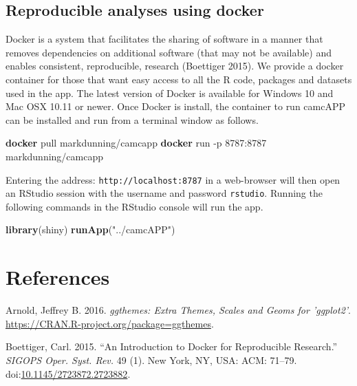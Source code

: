 \documentclass[]{article}
\newenvironment{Shaded}{\begin{snugshade}}{\end{snugshade}}
\newcommand{\KeywordTok}[1]{\textcolor[rgb]{0.13,0.29,0.53}{\textbf{{#1}}}}
\newcommand{\StringTok}[1]{\textcolor[rgb]{0.31,0.60,0.02}{{#1}}}
\newcommand{\NormalTok}[1]{{#1}}
\begin{document}
\subsection{Reproducible analyses using
docker}\label{reproducible-analyses-using-docker}

Docker is a system that facilitates the sharing of software in a manner
that removes dependencies on additional software (that may not be
available) and enables consistent, reproducible, research (Boettiger
2015). We provide a docker container for those that want easy access to
all the R code, packages and datasets used in the app. The latest
version of Docker is available for Windows 10 and Mac OSX 10.11 or
newer. Once Docker is install, the container to run camcAPP can be
installed and run from a terminal window as follows.

\begin{Shaded}
\begin{Highlighting}[]
\KeywordTok{docker} \NormalTok{pull markdunning/camcapp}
\KeywordTok{docker} \NormalTok{run -p 8787:8787 markdunning/camcapp}
\end{Highlighting}
\end{Shaded}

Entering the address: \texttt{http://localhost:8787} in a web-browser
will then open an RStudio session with the username and password
\texttt{rstudio}. Running the following commands in the RStudio console
will run the app.

\begin{Shaded}
\begin{Highlighting}[]
\KeywordTok{library}\NormalTok{(shiny)}
\KeywordTok{runApp}\NormalTok{(}\StringTok{"../camcAPP"}\NormalTok{)}
\end{Highlighting}
\end{Shaded}

\section*{References}\label{references}

\hypertarget{refs}{}
\hypertarget{ref-ggthemes}{}
Arnold, Jeffrey B. 2016. \emph{ggthemes: Extra Themes, Scales and Geoms
for 'ggplot2'}. \url{https://CRAN.R-project.org/package=ggthemes}.

\hypertarget{ref-Boettiger:2015:IDR:2723872.2723882}{}
Boettiger, Carl. 2015. ``An Introduction to Docker for Reproducible
Research.'' \emph{SIGOPS Oper. Syst. Rev.} 49 (1). New York, NY, USA:
ACM: 71--79.
doi:\href{https://doi.org/10.1145/2723872.2723882}{10.1145/2723872.2723882}.
\end{document}
